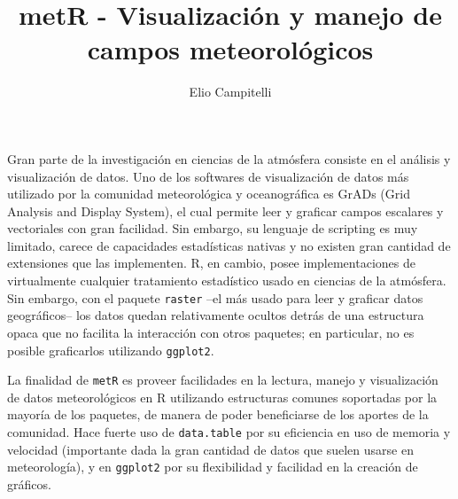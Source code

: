\documentclass[runningheads]{llncs}\usepackage{knitr}
\begin{document}
\title{metR - Visualización y manejo de campos meteorológicos}

%
\author{Elio Campitelli}

%
%
%
\maketitle              %
%




Gran parte de la investigación en ciencias de la atmósfera consiste en el análisis y visualización de datos. Uno de los softwares de visualización de datos más utilizado por la comunidad meteorológica y oceanográfica es GrADs (Grid Analysis and Display System), el cual permite leer y graficar campos escalares y vectoriales con gran facilidad. Sin embargo, su lenguaje de scripting es muy limitado, carece de capacidades estadísticas nativas y no existen gran cantidad de extensiones que las implementen. R, en cambio, posee implementaciones de virtualmente cualquier tratamiento estadístico usado en ciencias de la atmósfera. Sin embargo, con el paquete \texttt{raster} --el más usado para leer y graficar datos geográficos-- los datos quedan relativamente ocultos detrás de una estructura opaca que no facilita la interacción con otros paquetes; en particular, no es posible graficarlos utilizando \texttt{ggplot2}. 

La finalidad de \texttt{metR} es proveer facilidades en la lectura, manejo y visualización de datos meteorológicos en R utilizando estructuras comunes soportadas por la mayoría de los paquetes, de manera de poder beneficiarse de los aportes de la comunidad. Hace fuerte uso de \texttt{data.table} por su eficiencia en uso de memoria y velocidad (importante dada la gran cantidad de datos que suelen usarse en meteorología), y en \texttt{ggplot2} por su flexibilidad y facilidad en la creación de gráficos. 
\end{document}
